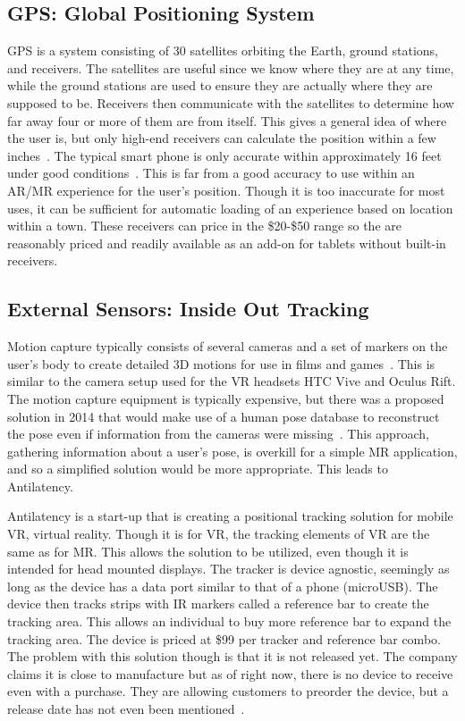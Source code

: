 \documentclass[10pt,draftclsnofoot,onecolumn,letterpaper]{IEEEtran}
\begin{document}
\subsection{GPS: Global Positioning System}
GPS is a system consisting of 30 satellites orbiting the Earth, ground stations, and receivers. The satellites are useful since we know where they are at any time, while the ground stations are used to ensure they are actually where they are supposed to be. Receivers then communicate with the satellites to determine how far away four or more of them are from itself. This gives a general idea of where the user is, but only high-end receivers can calculate the position within a few inches~\cite{GPS}. The typical smart phone is only accurate within approximately 16 feet under good conditions~\cite{GPSacc}. This is far from a good accuracy to use within an AR/MR experience for the user's position. Though it is too inaccurate for most uses, it can be sufficient for automatic loading of an experience based on location within a town. These receivers can price in the \$20-\$50 range so the are reasonably priced and readily available as an add-on for tablets without built-in receivers.

\subsection{External Sensors: Inside Out Tracking}
Motion capture typically consists of several cameras and a set of markers on the user's body to create detailed 3D motions for use in films and games~\cite{MoCap}. This is similar to the camera setup used for the VR headsets HTC Vive and Oculus Rift. The motion capture equipment is typically expensive, but there was a proposed solution in 2014 that would make use of a human pose database to reconstruct the pose even if information from the cameras were missing~\cite{MoCap}. This approach, gathering information about a user's pose, is overkill for a simple MR application, and so a simplified solution would be more appropriate. This leads to Antilatency.\par

Antilatency is a start-up that is creating a positional tracking solution for mobile VR, virtual reality. Though it is for VR, the tracking elements of VR are the same as for MR. This allows the solution to be utilized, even though it is intended for head mounted displays. The tracker is device agnostic, seemingly as long as the device has a data port similar to that of a phone (microUSB). The device then tracks strips with IR markers called a reference bar to create the tracking area. This allows an individual to buy more reference bar to expand the tracking area. The device is priced at \$99 per tracker and reference bar combo. The problem with this solution though is that it is not released yet. The company claims it is close to manufacture but as of right now, there is no device to receive even with a purchase. They are allowing customers to preorder the device, but a release date has not even been mentioned~\cite{AL}.\par
\end{document}
